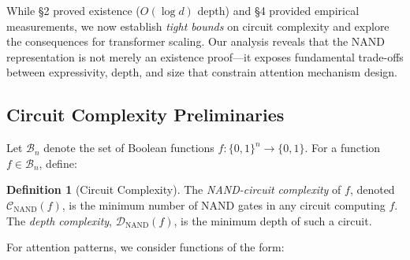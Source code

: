 \documentclass[11pt]{article}
\theoremstyle{definition}
\newtheorem{definition}[theorem]{Definition}
\begin{document}
While §2 proved existence ($O(\log d)$ depth) and §4 provided empirical measurements, we now establish \emph{tight bounds} on circuit complexity and explore the consequences for transformer scaling. Our analysis reveals that the NAND representation is not merely an existence proof---it exposes fundamental trade-offs between expressivity, depth, and size that constrain attention mechanism design.













\subsection{Circuit Complexity Preliminaries}













Let $\mathcal{B}_n$ denote the set of Boolean functions $f: \{0,1\}^n \to \{0,1\}$. For a function $f \in \mathcal{B}_n$, define:













\begin{definition}[Circuit Complexity]






The \emph{NAND-circuit complexity} of $f$, denoted $\mathcal{C}_{\text{NAND}}(f)$, is the minimum number of NAND gates in any circuit computing $f$. The \emph{depth complexity}, $\mathcal{D}_{\text{NAND}}(f)$, is the minimum depth of such a circuit.






\end{definition}













For attention patterns, we consider functions of the form:
\end{document}
